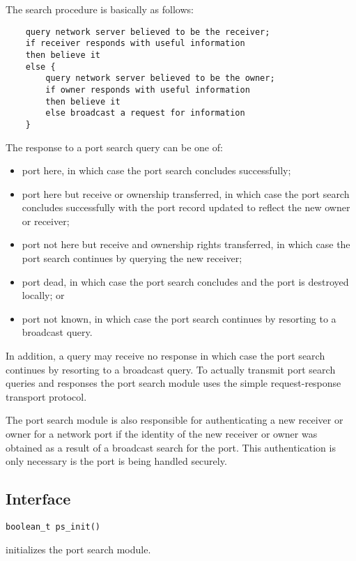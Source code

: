 The search procedure is basically as follows:
\begin{verbatim}
    query network server believed to be the receiver;
    if receiver responds with useful information
    then believe it
    else {
        query network server believed to be the owner;
        if owner responds with useful information
        then believe it
        else broadcast a request for information
    }
\end{verbatim}

\pagebreak[0]
The response to a port search query can be one of:
\begin{itemize}
\item port here, in which case the port search concludes successfully;

\item port here but receive or ownership transferred, in which case the port
search concludes successfully with the port record updated to reflect the
new owner or receiver;

\item port not here but receive and ownership rights transferred, in which
case the port search continues by querying the new receiver;

\item port dead, in which case the port search concludes and the port is
destroyed locally; or

\item port not known, in which case the port search continues by resorting
to a broadcast query.
\end{itemize}
In addition, a query may receive no response in which case the port search
continues by resorting to a broadcast query.  To actually transmit port
search queries and responses the port search module uses the simple
request-response transport protocol.

The port search module is also responsible for authenticating a new receiver
or owner for a network port if the identity of the new receiver or owner was
obtained as a result of a broadcast search for the port.  This
authentication is only necessary is the port is being handled securely.

\subsection{Interface}
\begin{verbatim}
boolean_t ps_init()
\end{verbatim}
initializes the port search module.

